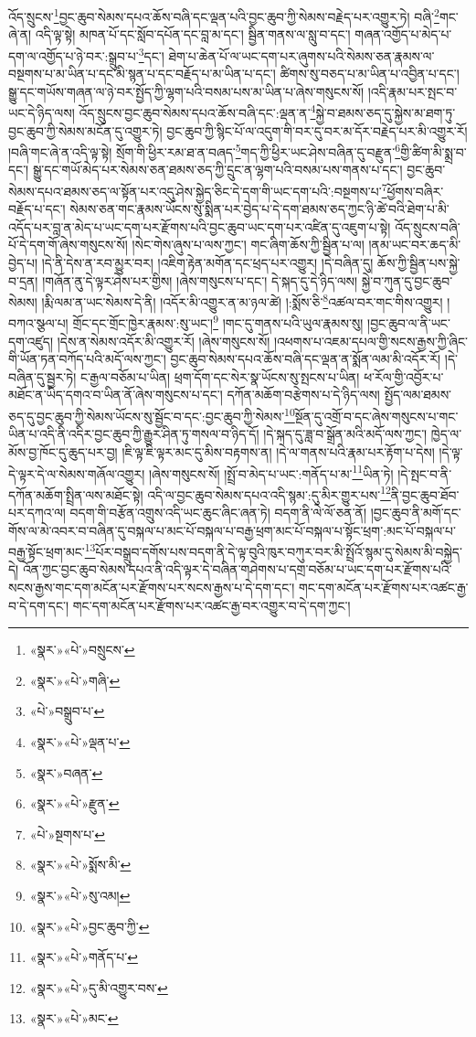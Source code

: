 འོད་སྲུངས་\footnote{«སྣར་»«པེ་»བསྲུངས་}བྱང་ཆུབ་སེམས་དཔའ་ཆོས་བཞི་དང་ལྡན་པའི་བྱང་ཆུབ་ཀྱི་སེམས་བརྗེད་པར་འགྱུར་ཏེ། བཞི་\footnote{«སྣར་»«པེ་»གཞི་}གང་ཞེ་ན། འདི་ལྟ་སྟེ། མཁན་པོ་དང་སློབ་དཔོན་དང་བླ་མ་དང་། སྦྱིན་གནས་ལ་སླུ་བ་དང་། གཞན་འགྱོད་པ་མེད་པ་དག་ལ་འགྱོད་པ་ཉེ་བར་:སྒྲུབ་པ་\footnote{«པེ་»བསྒྲུབ་པ་}དང་། ཐེག་པ་ཆེན་པོ་ལ་ཡང་དག་པར་ཞུགས་པའི་སེམས་ཅན་རྣམས་ལ་བསྔགས་པ་མ་ཡིན་པ་དང་མི་སྙན་པ་དང་བརྗོད་པ་མ་ཡིན་པ་དང་། ཚིགས་སུ་བཅད་པ་མ་ཡིན་པ་འབྱིན་པ་དང་། སྒྱུ་དང་གཡོས་གཞན་ལ་ཉེ་བར་སྤྱོད་ཀྱི་ལྷག་པའི་བསམ་པས་མ་ཡིན་པ་ཞེས་གསུངས་སོ། །འདི་རྣམ་པར་སྤང་བ་ཡང་དེ་ཉིད་ལས། འོད་སྲུངས་བྱང་ཆུབ་སེམས་དཔའ་ཆོས་བཞི་དང་:ལྡན་ན་\footnote{«སྣར་»«པེ་»ལྡན་པ་}སྐྱེ་བ་ཐམས་ཅད་དུ་སྐྱེས་མ་ཐག་ཏུ་བྱང་ཆུབ་ཀྱི་སེམས་མངོན་དུ་འགྱུར་ཏེ། བྱང་ཆུབ་ཀྱི་སྙིང་པོ་ལ་འདུག་གི་བར་དུ་བར་མ་དོར་བརྗེད་པར་མི་འགྱུར་རོ། །བཞི་གང་ཞེ་ན་འདི་ལྟ་སྟེ། སྲོག་གི་ཕྱིར་རམ་ཐ་ན་བཞད་\footnote{«སྣར་»བཞན་}གད་ཀྱི་ཕྱིར་ཡང་ཤེས་བཞིན་དུ་བརྫུན་\footnote{«སྣར་»«པེ་»རྫུན་}གྱི་ཚིག་མི་སྨྲ་བ་དང་། སྒྱུ་དང་གཡོ་མེད་པར་སེམས་ཅན་ཐམས་ཅད་ཀྱི་དྲུང་ན་ལྷག་པའི་བསམ་པས་གནས་པ་དང་། བྱང་ཆུབ་སེམས་དཔའ་ཐམས་ཅད་ལ་སྟོན་པར་འདུ་ཤེས་སྐྱེད་ཅིང་དེ་དག་གི་ཡང་དག་པའི་:བསྔགས་པ་\footnote{«པེ་»སྔགས་པ་}ཕྱོགས་བཞིར་བརྗོད་པ་དང་། སེམས་ཅན་གང་རྣམས་ཡོངས་སུ་སྨིན་པར་བྱེད་པ་དེ་དག་ཐམས་ཅད་ཀྱང་ཉི་ཚེ་བའི་ཐེག་པ་མི་འདོད་པར་བླ་ན་མེད་པ་ཡང་དག་པར་རྫོགས་པའི་བྱང་ཆུབ་ཡང་དག་པར་འཛིན་དུ་འཇུག་པ་སྟེ། འོད་སྲུངས་བཞི་པོ་དེ་དག་གོ་ཞེས་གསུངས་སོ། །སེང་གེས་ཞུས་པ་ལས་ཀྱང་། གང་ཞིག་ཆོས་ཀྱི་སྦྱིན་པ་ལ། །ནམ་ཡང་བར་ཆད་མི་བྱེད་པ། །དེ་ནི་དེས་ན་རབ་མྱུར་བར། །འཇིག་རྟེན་མགོན་དང་ཕྲད་པར་འགྱུར། །དེ་བཞིན་དུ། ཆོས་ཀྱི་སྦྱིན་པས་སྐྱེ་བ་དྲན། །གཞོན་ནུ་དེ་ལྟར་ཤེས་པར་གྱིས། །ཞེས་གསུངས་པ་དང་། དེ་སྐད་དུ་དེ་ཉིད་ལས། སྐྱེ་བ་ཀུན་དུ་བྱང་ཆུབ་སེམས། །རྨི་ལམ་ན་ཡང་སེམས་དེ་ནི། །འདོར་མི་འགྱུར་ན་མ་ཉལ་ཚེ། །:སྨོས་ཅི་\footnote{«སྣར་»«པེ་»སྨོས་མི་}འཚལ་བར་གང་གིས་འགྱུར། །བཀའ་སྩལ་པ། གྲོང་དང་གྲོང་ཁྱེར་རྣམས་:སུ་ཡང་།\footnote{«སྣར་»«པེ་»སུ་འམ།} །གང་དུ་གནས་པའི་ཡུལ་རྣམས་སུ། །བྱང་ཆུབ་ལ་ནི་ཡང་དག་འཛུད། །དེས་ན་སེམས་འདོར་མི་འགྱུར་རོ། །ཞེས་གསུངས་སོ། །འཕགས་པ་འཇམ་དཔལ་གྱི་སངས་རྒྱས་ཀྱི་ཞིང་གི་ཡོན་ཏན་བཀོད་པའི་མདོ་ལས་ཀྱང་། བྱང་ཆུབ་སེམས་དཔའ་ཆོས་བཞི་དང་ལྡན་ན་སྨོན་ལམ་མི་འདོར་རོ། །དེ་བཞིན་དུ་སྦྱར་ཏེ། ང་རྒྱལ་བཅོམ་པ་ཡིན། ཕྲག་དོག་དང་སེར་སྣ་ཡོངས་སུ་སྤངས་པ་ཡིན། ཕ་རོལ་གྱི་འབྱོར་པ་མཐོང་ན་ཡིད་དགའ་བ་ཡིན་ནོ་ཞེས་གསུངས་པ་དང་། དཀོན་མཆོག་བརྩེགས་པ་དེ་ཉིད་ལས། སྤྱོད་ལམ་ཐམས་ཅད་དུ་བྱང་ཆུབ་ཀྱི་སེམས་ཡོངས་སུ་སྦྱོང་བ་དང་:བྱང་ཆུབ་ཀྱི་སེམས་\footnote{«སྣར་»«པེ་»བྱང་ཆུབ་ཀྱི་}སྔོན་དུ་འགྲོ་བ་དང་ཞེས་གསུངས་པ་གང་ཡིན་པ་འདི་ནི་འདིར་བྱང་ཆུབ་ཀྱི་རྒྱུར་ཤིན་ཏུ་གསལ་བ་ཉིད་དོ། །དེ་སྐད་དུ་ཟླ་བ་སྒྲོན་མའི་མདོ་ལས་ཀྱང་། ཁྱེད་ལ་མོས་བྱ་ཁོང་དུ་ཆུད་པར་བྱ། །ཇི་ལྟ་ཇི་ལྟར་མང་དུ་མིས་བརྟགས་ན། །དེ་ལ་གནས་པའི་རྣམ་པར་རྟོག་པ་དེས། །དེ་ལྟ་དེ་ལྟར་དེ་ལ་སེམས་གཞོལ་འགྱུར། །ཞེས་གསུངས་སོ། །སྤྲོ་བ་མེད་པ་ཡང་:གནོད་པ་མ་\footnote{«སྣར་»«པེ་»གནོད་པ་}ཡིན་ཏེ། །དེ་སྤང་བ་ནི་དཀོན་མཆོག་སྤྲིན་ལས་མཐོང་སྟེ། འདི་ལ་བྱང་ཆུབ་སེམས་དཔའ་འདི་སྙམ་:དུ་མིར་གྱུར་པས་\footnote{«སྣར་»«པེ་»དུ་མི་འགྱུར་བས་}ནི་བྱང་ཆུབ་ཐོབ་པར་དཀའ་ལ། བདག་གི་བརྩོན་འགྲུས་འདི་ཡང་ཆུང་ཞིང་ཞན་ཏེ། བདག་ནི་ལེ་ལོ་ཅན་ནོ། །བྱང་ཆུབ་ནི་མགོ་དང་གོས་ལ་མེ་འབར་བ་བཞིན་དུ་བསྐལ་པ་མང་པོ་བསྐལ་པ་བརྒྱ་ཕྲག་མང་པོ་བསྐལ་པ་སྟོང་ཕྲག་:མང་པོ་བསྐལ་པ་བརྒྱ་སྟོང་ཕྲག་མང་\footnote{«སྣར་»«པེ་»མང་}པོར་བསྒྲུབ་དགོས་པས་བདག་ནི་དེ་ལྟ་བུའི་ཁུར་བཀུར་བར་མི་སྤྲོའོ་སྙམ་དུ་སེམས་མི་བསྐྱེད་དེ། འོན་ཀྱང་བྱང་ཆུབ་སེམས་དཔའ་ནི་འདི་ལྟར་དེ་བཞིན་གཤེགས་པ་དགྲ་བཅོམ་པ་ཡང་དག་པར་རྫོགས་པའི་སངས་རྒྱས་གང་དག་མངོན་པར་རྫོགས་པར་སངས་རྒྱས་པ་དེ་དག་དང་། གང་དག་མངོན་པར་རྫོགས་པར་འཚང་རྒྱ་བ་དེ་དག་དང་། གང་དག་མངོན་པར་རྫོགས་པར་འཚང་རྒྱ་བར་འགྱུར་བ་དེ་དག་ཀྱང་། 